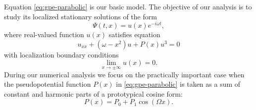 Equation \eqref{eq:gpe-parabolic} is our basic model.
The objective of our analysis is to study its localized stationary solutions of the form
\begin{equation}
	\Psi(t, x) = u(x) e^{-i \omega t},
\end{equation}
where real-valued function $u(x)$ satisfies equation
\begin{equation}
	u_{xx} + (\omega - x^2) u + P(x) u^3 = 0
\label{eq:nho-periodic}
\end{equation}
with localization boundary conditions
\begin{equation}
	\lim \limits_{x \to \pm \infty} u(x) = 0.
\end{equation}
During our numerical analysis we focus on the practically important case when the pseudopotential function $P(x)$ in \eqref{eq:gpe-parabolic} is taken as a sum of constant and harmonic parts of a prototypical cosine form:
\begin{equation}
	P(x) = P_0 + P_1 \cos (\Omega x).
\label{eq:gpe-parabolic-pseudopotential}
\end{equation}

